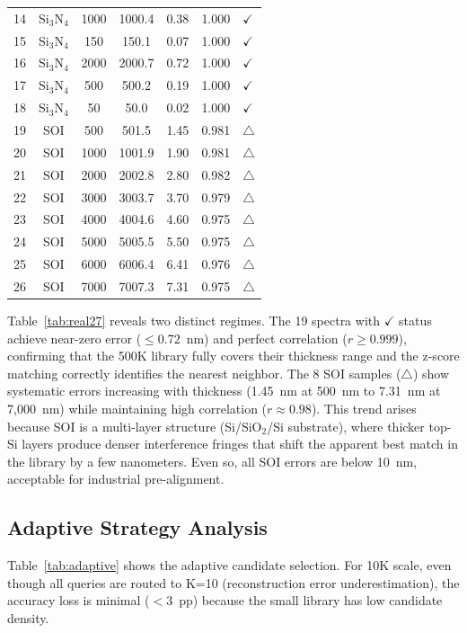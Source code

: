 \documentclass[final,5p,times]{elsarticle}
\begin{document}
\begin{table}[H]
\begin{tabular}{lcccccl}
14 & Si$_3$N$_4$ & 1000 & 1000.4 & 0.38 & 1.000 & $\checkmark$ \\
15 & Si$_3$N$_4$ &  150 &  150.1 & 0.07 & 1.000 & $\checkmark$ \\
16 & Si$_3$N$_4$ & 2000 & 2000.7 & 0.72 & 1.000 & $\checkmark$ \\
17 & Si$_3$N$_4$ &  500 &  500.2 & 0.19 & 1.000 & $\checkmark$ \\
18 & Si$_3$N$_4$ &   50 &   50.0 & 0.02 & 1.000 & $\checkmark$ \\
19 & SOI &  500 &  501.5 & 1.45 & 0.981 & $\triangle$ \\
20 & SOI & 1000 & 1001.9 & 1.90 & 0.981 & $\triangle$ \\
21 & SOI & 2000 & 2002.8 & 2.80 & 0.982 & $\triangle$ \\
22 & SOI & 3000 & 3003.7 & 3.70 & 0.979 & $\triangle$ \\
23 & SOI & 4000 & 4004.6 & 4.60 & 0.975 & $\triangle$ \\
24 & SOI & 5000 & 5005.5 & 5.50 & 0.975 & $\triangle$ \\
25 & SOI & 6000 & 6006.4 & 6.41 & 0.976 & $\triangle$ \\
26 & SOI & 7000 & 7007.3 & 7.31 & 0.975 & $\triangle$ \\
\bottomrule
\end{tabular}
\end{table}

Table~\ref{tab:real27} reveals two distinct regimes. The 19 spectra with $\checkmark$ status achieve near-zero error ($\leq$0.72~nm) and perfect correlation ($r\geq0.999$), confirming that the 500K library fully covers their thickness range and the z-score matching correctly identifies the nearest neighbor. The 8 SOI samples ($\triangle$) show systematic errors increasing with thickness (1.45~nm at 500~nm to 7.31~nm at 7,000~nm) while maintaining high correlation ($r\approx0.98$). This trend arises because SOI is a multi-layer structure (Si/SiO$_2$/Si substrate), where thicker top-Si layers produce denser interference fringes that shift the apparent best match in the library by a few nanometers. Even so, all SOI errors are below 10~nm, acceptable for industrial pre-alignment.

\subsection{Adaptive Strategy Analysis}

Table~\ref{tab:adaptive} shows the adaptive candidate selection. For 10K scale, even though all queries are routed to K=10 (reconstruction error underestimation), the accuracy loss is minimal ($<$3~pp) because the small library has low candidate density.
\end{document}
